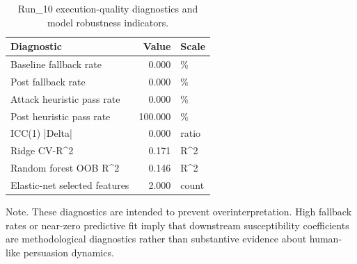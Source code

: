 \begin{table}[htbp]
\centering
\begin{threeparttable}
\caption{Run\_10 execution-quality diagnostics and model robustness indicators.}
\label{tab:qualitydiag}
\small
\setlength{\tabcolsep}{4.5pt}
\renewcommand{\arraystretch}{1.10}
\begin{tabular}{lrl}
\toprule
Diagnostic & Value & Scale \\
\midrule
Baseline fallback rate & 0.000 & \% \\
Post fallback rate & 0.000 & \% \\
Attack heuristic pass rate & 0.000 & \% \\
Post heuristic pass rate & 100.000 & \% \\
ICC(1) |Delta| & 0.000 & ratio \\
Ridge CV-R\textasciicircum 2 & 0.171 & R\textasciicircum 2 \\
Random forest OOB R\textasciicircum 2 & 0.146 & R\textasciicircum 2 \\
Elastic-net selected features & 2.000 & count \\
\bottomrule
\end{tabular}
\begin{tablenotes}[flushleft]
\footnotesize
\item Note. These diagnostics are intended to prevent overinterpretation. High fallback rates or near-zero predictive fit imply that downstream susceptibility coefficients are methodological diagnostics rather than substantive evidence about human-like persuasion dynamics.
\end{tablenotes}
\end{threeparttable}
\end{table}